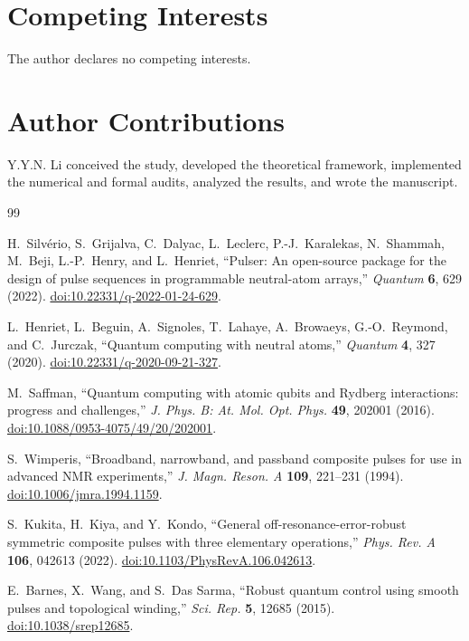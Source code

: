 \documentclass[11pt]{article}
\begin{document}
\section*{Competing Interests}
The author declares no competing interests.

\section*{Author Contributions}
Y.Y.N. Li conceived the study, developed the theoretical framework,
implemented the numerical and formal audits, analyzed the results,
and wrote the manuscript.

\begin{thebibliography}{99}

H.~Silv\'erio, S.~Grijalva, C.~Dalyac, L.~Leclerc,
P.-J.~Karalekas, N.~Shammah, M.~Beji, L.-P.~Henry, and L.~Henriet,
``Pulser: An open-source package for the design of pulse sequences in
programmable neutral-atom arrays,''
\emph{Quantum} \textbf{6}, 629 (2022).
\href{https://doi.org/10.22331/q-2022-01-24-629}
{doi:10.22331/q-2022-01-24-629}.

L.~Henriet, L.~Beguin, A.~Signoles, T.~Lahaye, A.~Browaeys,
G.-O.~Reymond, and C.~Jurczak,
``Quantum computing with neutral atoms,''
\emph{Quantum} \textbf{4}, 327 (2020).
\href{https://doi.org/10.22331/q-2020-09-21-327}
{doi:10.22331/q-2020-09-21-327}.

M.~Saffman,
``Quantum computing with atomic qubits and Rydberg interactions:
progress and challenges,''
\emph{J. Phys. B: At. Mol. Opt. Phys.} \textbf{49}, 202001 (2016).
\href{https://doi.org/10.1088/0953-4075/49/20/202001}
{doi:10.1088/0953-4075/49/20/202001}.

S.~Wimperis,
``Broadband, narrowband, and passband composite pulses for use in
advanced NMR experiments,''
\emph{J. Magn. Reson. A} \textbf{109}, 221--231 (1994).
\href{https://doi.org/10.1006/jmra.1994.1159}
{doi:10.1006/jmra.1994.1159}.

S.~Kukita, H.~Kiya, and Y.~Kondo,
``General off-resonance-error-robust symmetric composite pulses with
three elementary operations,''
\emph{Phys. Rev. A} \textbf{106}, 042613 (2022).
\href{https://doi.org/10.1103/PhysRevA.106.042613}
{doi:10.1103/PhysRevA.106.042613}.

E.~Barnes, X.~Wang, and S.~Das Sarma,
``Robust quantum control using smooth pulses and topological winding,''
\emph{Sci. Rep.} \textbf{5}, 12685 (2015).
\href{https://doi.org/10.1038/srep12685}
{doi:10.1038/srep12685}.


\end{thebibliography}
\end{document}
